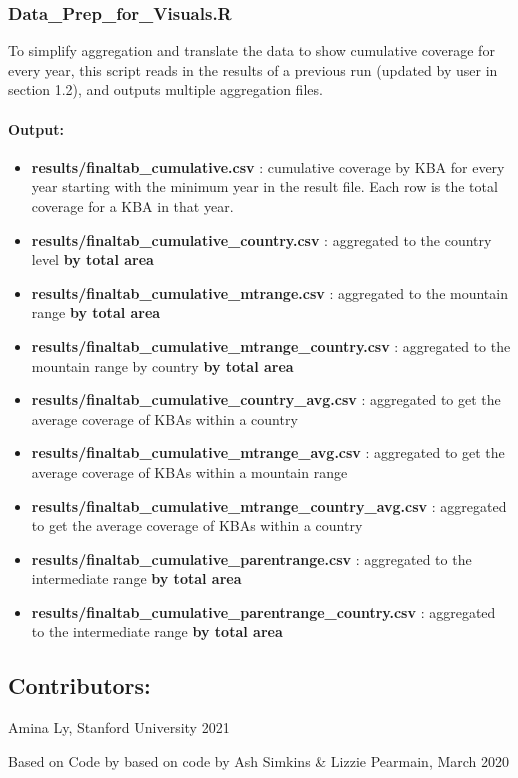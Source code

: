 \documentclass[
]{article}
\providecommand{\tightlist}{%
  \setlength{\itemsep}{0pt}\setlength{\parskip}{0pt}}
\begin{document}
\hypertarget{data_prep_for_visuals.r}{%
\subsubsection{Data\_Prep\_for\_Visuals.R}\label{data_prep_for_visuals.r}}

To simplify aggregation and translate the data to show cumulative
coverage for every year, this script reads in the results of a previous
run (updated by user in section 1.2), and outputs multiple aggregation
files.

\hypertarget{output-2}{%
\paragraph{Output:}\label{output-2}}

\begin{itemize}
\tightlist
\item
  \textbf{results/finaltab\_cumulative.csv} : cumulative coverage by KBA
  for every year starting with the minimum year in the result file. Each
  row is the total coverage for a KBA in that year.
\item
  \textbf{results/finaltab\_cumulative\_country.csv} : aggregated to the
  country level \textbf{by total area}
\item
  \textbf{results/finaltab\_cumulative\_mtrange.csv} : aggregated to the
  mountain range \textbf{by total area}
\item
  \textbf{results/finaltab\_cumulative\_mtrange\_country.csv} :
  aggregated to the mountain range by country \textbf{by total area}
\item
  \textbf{results/finaltab\_cumulative\_country\_avg.csv} : aggregated
  to get the average coverage of KBAs within a country
\item
  \textbf{results/finaltab\_cumulative\_mtrange\_avg.csv} : aggregated
  to get the average coverage of KBAs within a mountain range
\item
  \textbf{results/finaltab\_cumulative\_mtrange\_country\_avg.csv} :
  aggregated to get the average coverage of KBAs within a country
\item
  \textbf{results/finaltab\_cumulative\_parentrange.csv} : aggregated to
  the intermediate range \textbf{by total area}
\item
  \textbf{results/finaltab\_cumulative\_parentrange\_country.csv} :
  aggregated to the intermediate range \textbf{by total area}
\end{itemize}

\hypertarget{contributors}{%
\subsection{Contributors:}\label{contributors}}

Amina Ly, Stanford University 2021

Based on Code by based on code by Ash Simkins \& Lizzie Pearmain, March
2020
\end{document}
